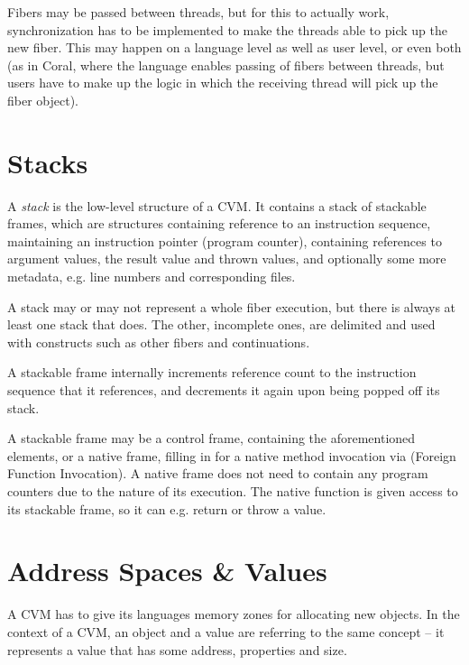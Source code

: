 Fibers may be passed between threads, but for this to actually work, synchronization has to be implemented to make the threads able to pick up the new fiber. This may happen on a language level as well as user level, or even both (as in Coral, where the language enables passing of fibers between threads, but users have to make up the logic in which the receiving thread will pick up the fiber object). 





\section{Stacks}

A {\em stack} is the low-level structure of a CVM. It contains a stack of stackable frames, which are structures containing reference to an instruction sequence, maintaining an instruction pointer (program counter), containing references to argument values, the result value and thrown values, and optionally some more metadata, e.g. line numbers and corresponding files. 

A stack may or may not represent a whole fiber execution, but there is always at least one stack that does. The other, incomplete ones, are delimited and used with constructs such as other fibers and continuations. 

A stackable frame internally increments reference count to the instruction sequence that it references, and decrements it again upon being popped off its stack. 

A stackable frame may be a control frame, containing the aforementioned elements, or a native frame, filling in for a native method invocation via  (Foreign Function Invocation). A native frame does not need to contain any program counters due to the nature of its execution. The native function is given access to its stackable frame, so it can e.g. return or throw a value. 






\section{Address Spaces \& Values}

A CVM has to give its languages memory zones for allocating new objects. In the context of a CVM, an object and a value are referring to the same concept -- it represents a value that has some address, properties and size. 

